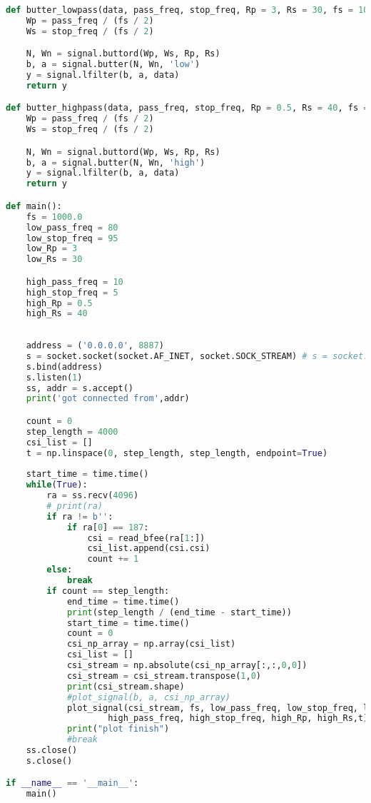 \documentclass[UTF8]{article}
\begin{document}
\begin{lstlisting}[language=Python, caption=server.py]
def butter_lowpass(data, pass_freq, stop_freq, Rp = 3, Rs = 30, fs = 1000):
    Wp = pass_freq / (fs / 2)
    Ws = stop_freq / (fs / 2)

    N, Wn = signal.buttord(Wp, Ws, Rp, Rs)
    b, a = signal.butter(N, Wn, 'low')
    y = signal.lfilter(b, a, data)
    return y

def butter_highpass(data, pass_freq, stop_freq, Rp = 0.5, Rs = 40, fs = 1000):
    Wp = pass_freq / (fs / 2)
    Ws = stop_freq / (fs / 2)

    N, Wn = signal.buttord(Wp, Ws, Rp, Rs)
    b, a = signal.butter(N, Wn, 'high')
    y = signal.lfilter(b, a, data)
    return y

def main():
    fs = 1000.0
    low_pass_freq = 80
    low_stop_freq = 95
    low_Rp = 3
    low_Rs = 30

    high_pass_freq = 10
    high_stop_freq = 5
    high_Rp = 0.5
    high_Rs = 40
    
    
    address = ('0.0.0.0', 8887)  
    s = socket.socket(socket.AF_INET, socket.SOCK_STREAM) # s = socket.socket()  
    s.bind(address)  
    s.listen(1)
    ss, addr = s.accept()  
    print('got connected from',addr)

    count = 0
    step_length = 4000
    csi_list = []
    t = np.linspace(0, step_length, step_length, endpoint=True)
    
    start_time = time.time()
    while(True):
        ra = ss.recv(4096)  
        # print(ra)
        if ra != b'':
            if ra[0] == 187:
                csi = read_bfee(ra[1:])
                csi_list.append(csi.csi)
                count += 1
        else:
            break
        if count == step_length:
            end_time = time.time()
            print(step_length / (end_time - start_time))
            start_time = time.time()
            count = 0
            csi_np_array = np.array(csi_list)
            csi_list = []
            csi_stream = np.absolute(csi_np_array[:,:,0,0])
            csi_stream = csi_stream.transpose(1,0)
            print(csi_stream.shape)
            #plot_signal(b, a, csi_np_array)
            plot_signal(csi_stream, fs, low_pass_freq, low_stop_freq, low_Rp, low_Rs,
                    high_pass_freq, high_stop_freq, high_Rp, high_Rs,t)
            print("plot finish")
            #break
    ss.close()  
    s.close()  

if __name__ == '__main__':
    main()
\end{lstlisting}
\end{document}
